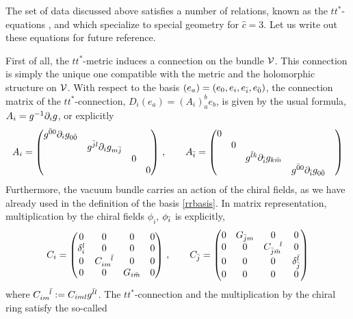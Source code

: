 The set of data discussed above satisfies a number of relations, known as 
the $tt^*$-equations \cite{ceva}, and which specialize to special geometry 
for $\hat c=3$. Let us write out these equations for future reference.

First of all, the $tt^*$-metric induces a connection on the bundle
${\cal V}$. This connection is simply the unique one compatible with the 
metric and the holomorphic structure on ${\cal V}$. With respect to the 
basis $(e_a) = (e_0,e_i,e_\ib,e_\0b)$, the connection matrix of the 
$tt^*$-connection, $D_i (e_a) = (A_i)_a^b e_b$, is given by the usual 
formula, $A_i = g^{-1}\partial_i g$, or explicitly
\begin{equation}
\eqlabel{ttstarcon}
A_i = \begin{pmatrix}
g^{\0b 0}\del_ig_{0\0b}&&&\\
& g^{\jb l}\del_i g_{m \jb} &  & \\
 &  &  0 &  \\
 &  &   & 0 
\end{pmatrix}\,,
\qquad
A_\ib = 
\begin{pmatrix}
0 &  &  &  \\
 & 0& & & \\
 & & g^{\lb k}\del_\ib g_{k\mb} &\\
& & & g^{\0b 0}\del_\ib g_{0\0b}
\end{pmatrix} 
\end{equation}
Furthermore, the vacuum bundle carries an action of the chiral fields, as
we have already used in the definition of the basis \eqref{rrbasis}.
In matrix representation, multiplication by the chiral fields $\phi_i$,
$\phi_{\bar i}$ is explicitly,
\begin{equation}
\eqlabel{struccon}
C_i = \begin{pmatrix}
0&0&0&0\\
\delta_i^l & 0 & 0 & 0\\
0 & C_{im}^{\;\;\;\;\lb} & 0 & 0\\
0&0&G_{i\mb}&0
\end{pmatrix}\,,
\qquad
C_\jb =
\begin{pmatrix}
0&G_{\jb m}&0&0\\
0&0&C_{\jb\mb}^{\;\;\;\;l} &0\\
0&0&0&\delta_{\jb}^\lb\\
0&0&0&0
\end{pmatrix}
\end{equation}
where $C_{im}^{\;\;\;\;{\bar l}}:=C_{iml} g^{{\bar l} l}$. The $tt^*$-connection 
and the multiplication by the chiral ring satisfy the so-called 
